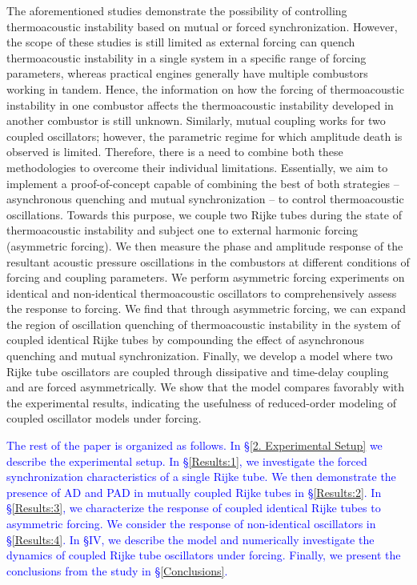 \documentclass[%
preprint,
 amsmath,amssymb,
 aps,
 pra,
]{revtex4-2}
\begin{document}
The aforementioned studies demonstrate the possibility of controlling thermoacoustic instability based on mutual or forced synchronization. However, the scope of these studies is still limited as external forcing can quench thermoacoustic instability in a single system in a specific range of forcing parameters, whereas practical engines generally have multiple combustors working in tandem. Hence, the information on how the forcing of thermoacoustic instability in one combustor affects the thermoacoustic instability developed in another combustor is still unknown. Similarly, mutual coupling works for two coupled oscillators; however, the parametric regime for which amplitude death is observed is limited. Therefore, there is a need to combine both these methodologies to overcome their individual limitations. Essentially, we aim to implement a proof-of-concept capable of combining the best of both strategies – asynchronous quenching and mutual synchronization – to control thermoacoustic oscillations. Towards this purpose, we couple two Rijke tubes during the state of thermoacoustic instability and subject one to external harmonic forcing (asymmetric forcing). We then measure the phase and amplitude response of the resultant acoustic pressure oscillations in the combustors at different conditions of forcing and coupling parameters. We perform asymmetric forcing experiments on identical and non-identical thermoacoustic oscillators to comprehensively assess the response to forcing. We find that through asymmetric forcing, we can expand the region of oscillation quenching of thermoacoustic instability in the system of coupled identical Rijke tubes by compounding the effect of asynchronous quenching and mutual synchronization. {\color{blue}Finally, we develop a model where two Rijke tube oscillators are coupled through dissipative and time-delay coupling and are forced asymmetrically. We show that the model compares favorably with the experimental results, indicating the usefulness of reduced-order modeling of coupled oscillator models under forcing.}

\textcolor{blue}{The rest of the paper is organized as follows. In \S\ref{2. Experimental Setup} we describe the experimental setup. In \S\ref{Results:1}, we investigate the forced synchronization characteristics of a single Rijke tube. We then demonstrate the presence of AD and PAD in mutually coupled Rijke tubes in \S\ref{Results:2}. In \S\ref{Results:3}, we characterize the response of coupled identical Rijke tubes to asymmetric forcing. We consider the response of non-identical oscillators in \S\ref{Results:4}. In \S{\color{blue}IV}, we describe the model and numerically investigate the dynamics of coupled Rijke tube oscillators under forcing. Finally, we present the conclusions from the study in \S\ref{Conclusions}.}
\end{document}
